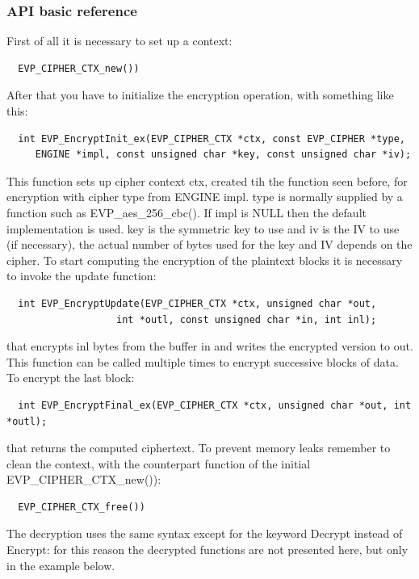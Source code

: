 \subsubsection*{API basic reference}
First of all it is necessary to set up a context:
\begin{verbatim}
  EVP_CIPHER_CTX_new())
\end{verbatim}
After that you have to initialize the encryption operation, with something like this:
\begin{verbatim}
  int EVP_EncryptInit_ex(EVP_CIPHER_CTX *ctx, const EVP_CIPHER *type,
     ENGINE *impl, const unsigned char *key, const unsigned char *iv);
\end{verbatim}
This function sets up cipher context ctx, created tih the function seen before, for encryption with cipher type from ENGINE impl. type is normally supplied by a function such as EVP\_aes\_256\_cbc(). If impl is NULL then the default implementation is used. key is the symmetric key to use and iv is the IV to use (if necessary), the actual number of bytes used for the key and IV depends on the cipher.
To start computing the encryption of the plaintext blocks it is necessary to invoke the update function:
\begin{verbatim}
  int EVP_EncryptUpdate(EVP_CIPHER_CTX *ctx, unsigned char *out,
                   int *outl, const unsigned char *in, int inl);
\end{verbatim}
that encrypts inl bytes from the buffer in and writes the encrypted version to out. This function can be called multiple times to encrypt successive blocks of data. To encrypt the last block:
\begin{verbatim}
  int EVP_EncryptFinal_ex(EVP_CIPHER_CTX *ctx, unsigned char *out, int *outl);
\end{verbatim}
that returns the computed ciphertext. To prevent memory leaks remember to clean the context, with the counterpart function of the initial EVP\_CIPHER\_CTX\_new()):
\begin{verbatim}
  EVP_CIPHER_CTX_free())
\end{verbatim}
The decryption uses the same syntax except for the keyword Decrypt instead of Encrypt: for this reason the decrypted functions are not presented here, but only in the example below.

